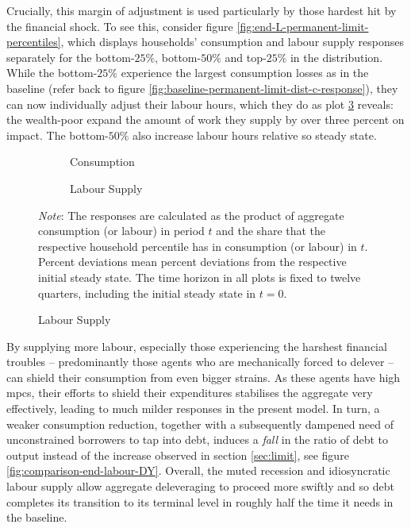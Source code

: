 \documentclass[a4paper,12pt]{article} %
\numberwithin{equation}{section} %
\numberwithin{figure}{section}
\numberwithin{table}{section}
\begin{document}
Crucially, this margin of adjustment is used particularly by those hardest hit by the financial shock. To see this, consider figure \ref{fig:end-L-permanent-limit-percentiles}, which displays households' consumption and labour supply responses separately for the bottom-$25\%$, bottom-$50\%$ and top-$25\%$ in the distribution. While the bottom-$25\%$ experience the largest consumption losses as in the baseline (refer back to figure \ref{fig:baseline-permanent-limit-dist-c-response}), they can now individually adjust their labour hours, which they do as plot \ref{fig:end-L-permanent-limit-percentiles-n} reveals: the wealth-poor expand the amount of work they supply by over three percent on impact. The bottom-$50\%$ also increase labour hours relative so steady state.

\begin{figure}[t]
    \caption{Consumption and Labour Supply Responses by Selected Percentiles}
    \label{fig:end-L-permanent-limit-percentiles}
    \centering
    \begin{subfigure}[b]{0.49\textwidth}
    \caption{Consumption}
    \label{fig:end-L-permanent-limit-percentiles-c}
         \centering
         
     \end{subfigure}
     \hfill
    \begin{subfigure}[b]{0.49\textwidth}
    \caption{Labour Supply}
    \label{fig:end-L-permanent-limit-percentiles-n}
         \centering
         
     \end{subfigure}
     
     \vspace{10pt}
     
     \justifying
     \footnotesize
	\textit{Note}: The responses are calculated as the product of aggregate consumption (or labour) in period $t$ and the share that the respective household percentile has in consumption (or labour) in $t$. Percent deviations mean percent deviations from the respective initial steady state. The time horizon in all plots is fixed to twelve quarters, including the initial steady state in $t=0$.
\end{figure}

By supplying more labour, especially those experiencing the harshest financial troubles -- predominantly those agents who are mechanically forced to delever -- can shield their consumption from even bigger strains. As these agents have high \Gls{mpc}s, their efforts to shield their expenditures stabilises the aggregate very effectively, leading to much milder responses in the present model. In turn, a weaker consumption reduction, together with a subsequently dampened need of unconstrained borrowers to tap into debt, induces a \textit{fall} in the ratio of debt to output instead of the increase observed in section \ref{sec:limit}, see figure \ref{fig:comparison-end-labour-DY}. Overall, the muted recession and idiosyncratic labour supply allow aggregate deleveraging to proceed more swiftly and so debt completes its transition to its terminal level in roughly half the time it needs in the baseline.
\end{document}
